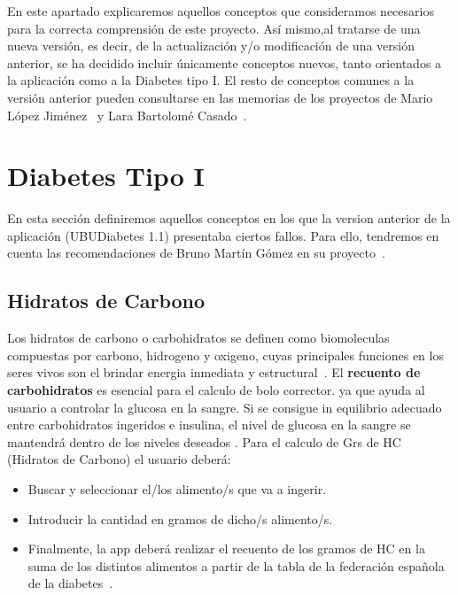 
En este apartado explicaremos aquellos conceptos que consideramos necesarios para la correcta comprensión de este proyecto.
Así mismo,al tratarse de una nueva versión, es decir, de la actualización y/o modificación de una versión anterior, se ha decidido incluir únicamente conceptos nuevos, tanto orientados a la aplicación como a la Diabetes tipo I. El resto de conceptos comunes a la versión anterior pueden consultarse en las memorias de los proyectos de Mario López Jiménez~\cite{mario2016} y Lara Bartolomé Casado~\cite{larab2015}.



\section{Diabetes Tipo I}
En esta sección definiremos aquellos conceptos en los que la version anterior de la aplicación (UBUDiabetes 1.1) presentaba ciertos fallos. Para ello, tendremos en cuenta las recomendaciones de Bruno Martín Gómez en su proyecto~\cite{bruno2017}.

\subsection{Hidratos de Carbono}

Los hidratos de carbono o carbohidratos se definen como biomoleculas compuestas por carbono, hidrogeno y oxigeno, cuyas principales funciones en los seres vivos son el brindar energia inmediata y estructural~\cite{wiki:carbs}.
El \textbf{recuento de carbohidratos} es esencial para el calculo de bolo corrector. ya que ayuda al usuario a controlar la glucosa en la sangre. Si se consigue in equilibrio adecuado entre carbohidratos ingeridos e insulina, el nivel de glucosa en la sangre se mantendrá dentro de los niveles deseados \cite{larab2015}.
Para el calculo de Grs de HC (Hidratos de Carbono) el usuario deberá:
\begin{itemize}
	\item Buscar y seleccionar el/los alimento/s que va a ingerir.
	\item Introducir la cantidad en gramos de dicho/s alimento/s.
	\item Finalmente, la app deberá realizar el recuento de los gramos de HC en la suma de los distintos alimentos a partir de la tabla de la federación española de la diabetes~\cite{tablafe}.
\end{itemize}
